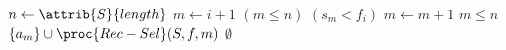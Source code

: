 \begin{codebox}
\li	$n \gets \attrib{S}{length}$
\li	$m \gets i + 1$
\li	\While $(m \leq n)$ \And $(s_m < f_i)$
\li	\Do
		$m \gets m + 1$
	\End
\li	\If $m \leq n$
\li	\Then
		\Return $\{a_m\} \cup \proc{Rec-Sel}(S,f,m)$
\li	\Else
\li		\Return $\emptyset$
	\End
\end{codebox}